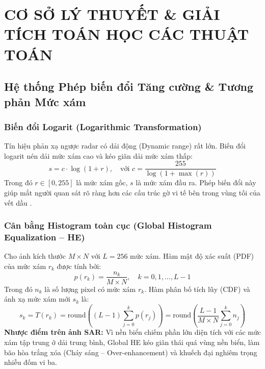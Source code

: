 \chapter{CƠ SỞ LÝ THUYẾT \& GIẢI TÍCH TOÁN HỌC CÁC THUẬT TOÁN}
\label{ch:ly_thuyet}

\section{Hệ thống Phép biến đổi Tăng cường \& Tương phản Mức xám}
\subsection{Biến đổi Logarit (Logarithmic Transformation)}
Tín hiệu phản xạ ngược radar có dải động (Dynamic range) rất lớn. Biến đổi logarit nén dải mức xám cao và kéo giãn dải mức xám thấp:
\begin{equation}
s = c \cdot \log(1 + r), \quad \text{với } c = \frac{255}{\log(1 + \max(r))}
\label{eq:log_trans}
\end{equation}
Trong đó $r \in [0, 255]$ là mức xám gốc, $s$ là mức xám đầu ra. Phép biến đổi này giúp mắt người quan sát rõ ràng hơn các cấu trúc gờ vi tế bên trong vùng tối của vết dầu \cite{utc2024dip}.

\subsection{Cân bằng Histogram toàn cục (Global Histogram Equalization -- HE)}
Cho ảnh kích thước $M \times N$ với $L = 256$ mức xám. Hàm mật độ xác suất (PDF) của mức xám $r_k$ được tính bởi:
\begin{equation}
p(r_k) = \frac{n_k}{M \times N}, \quad k = 0, 1, \dots, L-1
\label{eq:pdf}
\end{equation}
Trong đó $n_k$ là số lượng pixel có mức xám $r_k$. Hàm phân bố tích lũy (CDF) và ánh xạ mức xám mới $s_k$ là:
\begin{equation}
s_k = T(r_k) = \text{round}\left( (L - 1) \sum_{j=0}^k p(r_j) \right) = \text{round}\left( \frac{L - 1}{M \times N} \sum_{j=0}^k n_j \right)
\label{eq:cdf_mapping}
\end{equation}
\textbf{Nhược điểm trên ảnh SAR:} Vì nền biển chiếm phần lớn diện tích với các mức xám tập trung ở dải trung bình, Global HE kéo giãn thái quá vùng nền biển, làm bão hòa trắng xóa (Cháy sáng -- Over-enhancement) và khuếch đại nghiêm trọng nhiễu đốm vi ba.

